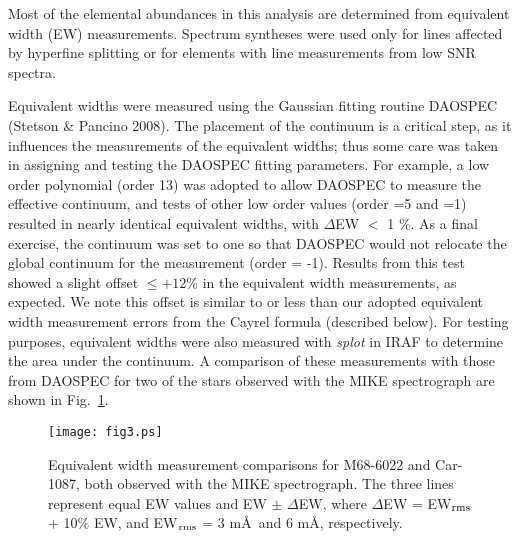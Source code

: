 \documentclass{emulateapj}
\begin{document}
Most of the elemental abundances in this analysis are determined
from equivalent width (EW) measurements.   Spectrum syntheses were 
used only for lines affected by hyperfine splitting or for elements
with line measurements from low SNR spectra.  

Equivalent widths were measured using the Gaussian fitting routine
DAOSPEC (Stetson \& Pancino 2008).    
The placement of the continuum is a critical step, as 
it influences the measurements of the equivalent widths; thus 
some care was taken in assigning and testing the DAOSPEC fitting 
parameters. For example, a low order polynomial (order 13) was adopted 
to allow DAOSPEC to measure the effective continuum, and tests of 
other low order values (order =5 and =1) resulted in nearly 
identical equivalent widths, with  $\Delta$EW $<$ 1 \%.
%
As a final exercise, the continuum was set to one so that DAOSPEC 
would not relocate the global continuum for the measurement 
(order = -1).  Results from this test showed a slight offset 
$\le +12\%$ in the equivalent width measurements, as expected.
We note this offset is similar to or less than our adopted equivalent 
width measurement errors from the Cayrel formula (described below).    
%
For testing purposes, equivalent widths were also measured with 
{\it splot} in IRAF to determine the area under the continuum.
A comparison of these measurements with those from DAOSPEC for two 
of the stars observed with the MIKE spectrograph are shown in 
Fig.~\ref{ew}.



\begin{figure}[hb]
\texttt{[image: fig3.ps]}
\caption{Equivalent width measurement comparisons 
for M68-6022 and Car-1087, both observed with the 
MIKE spectrograph.   The three lines represent equal 
EW values and EW $\pm$ $\Delta$EW, where
$\Delta$EW = EW$_{\rm rms}$ + 10\% EW, and 
EW$_{\rm rms}$ = 3 m\AA\ and 6 m\AA, respectively.
}
\label{ew}
\end{figure}
\end{document}

